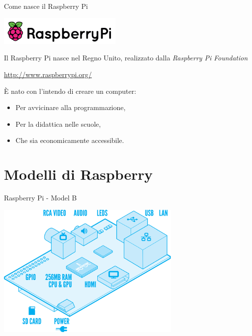 \documentclass[xcolor=svgnames,11pt]{beamer}
\begin{document}
\begin{frame}{Come nasce il Raspberry Pi}
\begin{center}
\includegraphics[width=6cm]{logo_raspi.png}
\end{center}
\pause

Il Raspberry Pi nasce nel Regno Unito, realizzato dalla \emph{Raspberry Pi Foundation}

\begin{center}
\url{http://www.raspberrypi.org/}
\end{center}

\pause
\medskip

\begin{block}{}
\`E nato con l'intendo di creare un computer:
\pause
\begin{itemize}
\item Per avvicinare alla programmazione,
\pause
\item Per la didattica nelle scuole,
\pause
\item Che sia economicamente accessibile.
\end{itemize}
\end{block}
\end{frame}

\section{Modelli di Raspberry}

\begin{frame}{Raspberry Pi - Model B}
\begin{center}
\includegraphics[width=9cm]{scheme.png}
\end{center}
\end{frame}
\end{document}
